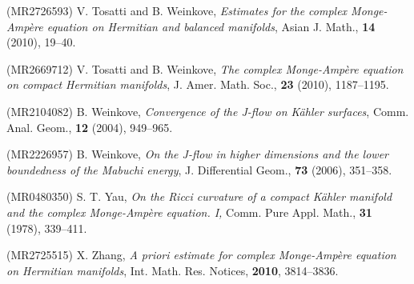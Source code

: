 \documentclass[12pt]{amsart}
\theoremstyle{definition}
\numberwithin{equation}{section}
\begin{document}
\begin{thebibliography}{99}
 (MR2726593)
\newblock V. Tosatti and B. Weinkove,
\newblock \emph{Estimates for the complex Monge-Amp\`ere equation on Hermitian and balanced manifolds},
\newblock Asian J. Math., \textbf{14} (2010), 19--40.

 (MR2669712)
\newblock V. Tosatti and B. Weinkove,
\newblock \emph{The complex Monge-Amp\`ere equation on compact
Hermitian manifolds},
\newblock J. Amer. Math. Soc., \textbf{23} (2010), 1187--1195.

 (MR2104082)
\newblock B. Weinkove,
\newblock \emph{Convergence of the J-flow on K\"ahler surfaces},
\newblock Comm. Anal. Geom., \textbf{12} (2004), 949--965.

 (MR2226957)
\newblock B. Weinkove,
\newblock \emph{On the J-flow in higher dimensions and the lower boundedness
of the Mabuchi energy},
\newblock J. Differential Geom., \textbf{73} (2006), 351--358.

 (MR0480350)
\newblock S. T. Yau,
\newblock \emph{On the Ricci curvature of a compact K\"ahler manifold and the complex Monge-Amp\`ere equation. I,}
\newblock Comm. Pure Appl. Math., \textbf{31} (1978), 339--411.

 (MR2725515)
\newblock X. Zhang,
\newblock \emph{A priori estimate for complex Monge-Amp\`ere equation on Hermitian manifolds},
\newblock Int. Math. Res. Notices, \textbf{2010}, 3814--3836.

\end{thebibliography}

\medskip
\medskip
\end{document}
